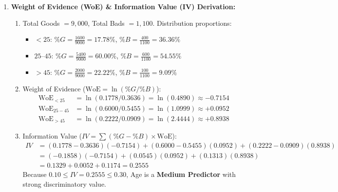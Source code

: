 \begin{enumerate}[label=\textbf{P8.\arabic*}]
    \item \textbf{Weight of Evidence (WoE) \& Information Value (IV) Derivation:}
    \begin{enumerate}[label=(\alph*)]
        \item Total Goods $= 9{,}000$, Total Bads $= 1{,}100$. Distribution proportions:
        \begin{itemize}
            \item $<25$: $\%G = \frac{1600}{9000} = 17.78\%$, $\%B = \frac{400}{1100} = 36.36\%$
            \item $25\text{--}45$: $\%G = \frac{5400}{9000} = 60.00\%$, $\%B = \frac{600}{1100} = 54.55\%$
            \item $>45$: $\%G = \frac{2000}{9000} = 22.22\%$, $\%B = \frac{100}{1100} = 9.09\%$
        \end{itemize}
        \item Weight of Evidence ($\text{WoE} = \ln(\%G / \%B)$):
        \begin{align*}
        \text{WoE}_{<25} &= \ln(0.1778 / 0.3636) = \ln(0.4890) \approx \mathbf{-0.7154} \\
        \text{WoE}_{25-45} &= \ln(0.6000 / 0.5455) = \ln(1.0999) \approx \mathbf{+0.0952} \\
        \text{WoE}_{>45} &= \ln(0.2222 / 0.0909) = \ln(2.4444) \approx \mathbf{+0.8938}
        \end{align*}
        \item Information Value ($IV = \sum (\%G - \%B) \times \text{WoE}$):
        \begin{align*}
        IV &= (0.1778 - 0.3636)(-0.7154) + (0.6000 - 0.5455)(0.0952) + (0.2222 - 0.0909)(0.8938) \\
        &= (-0.1858)(-0.7154) + (0.0545)(0.0952) + (0.1313)(0.8938) \\
        &= 0.1329 + 0.0052 + 0.1174 = \mathbf{0.2555}
        \end{align*}
        Because $0.10 \le IV = 0.2555 \le 0.30$, Age is a \textbf{Medium Predictor} with strong discriminatory value.
    \end{enumerate}


\end{enumerate}
